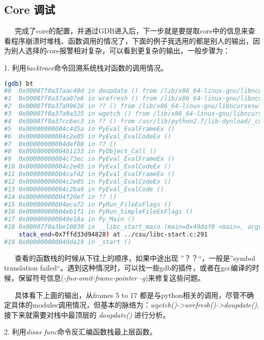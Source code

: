 \documentclass[12pt]{article}  %
\begin{document}
\subsection{Core 调试}
\ \ \ 完成了core的配置，并通过GDB进入后，下一步就是要提取core中的信息来查看程序崩溃时堆栈、函数调用的情况了，下面的例子我选用的都是别人的输出，因为别人选择的core报警相对复杂，可以看到更复杂的输出，一般步骤为：\par
1. 利用\emph{backtrace}命令回溯系统栈对函数的调用情况。\par
\begin{lstlisting}[language=sh]
(gdb) bt
#0  0x00007f0a37aac40d in doupdate () from /lib/x86_64-linux-gnu/libncursesw.so.5
#1  0x00007f0a37aa07e6 in wrefresh () from /lib/x86_64-linux-gnu/libncursesw.so.5
#2  0x00007f0a37a99616 in ?? () from /lib/x86_64-linux-gnu/libncursesw.so.5
#3  0x00007f0a37a9a325 in wgetch () from /lib/x86_64-linux-gnu/libncursesw.so.5
#4  0x00007f0a37cc6ec3 in ?? () from /usr/lib/python2.7/lib-dynload/_curses.x86_64-linux-gnu.so
#5  0x00000000004c4d5a in PyEval_EvalFrameEx ()
#6  0x00000000004c2e05 in PyEval_EvalCodeEx ()
#7  0x00000000004def08 in ?? ()
#8  0x00000000004b1153 in PyObject_Call ()
#9  0x00000000004c73ec in PyEval_EvalFrameEx ()
#10 0x00000000004c2e05 in PyEval_EvalCodeEx ()
#11 0x00000000004caf42 in PyEval_EvalFrameEx ()
#12 0x00000000004c2e05 in PyEval_EvalCodeEx ()
#13 0x00000000004c2ba9 in PyEval_EvalCode ()
#14 0x00000000004f20ef in ?? ()
#15 0x00000000004eca72 in PyRun_FileExFlags ()
#16 0x00000000004eb1f1 in PyRun_SimpleFileExFlags ()
#17 0x000000000049e18a in Py_Main ()
#18 0x00007f0a3be10830 in __libc_start_main (main=0x49daf0 <main>, argc=2, argv=0x7ffd33d94838, init=<optimized out>, fini=<optimized out>, rtld_fini=<optimized out>, 
    stack_end=0x7ffd33d94828) at ../csu/libc-start.c:291
#19 0x000000000049da19 in _start ()
\end{lstlisting}\par
\ \ \ 查看的函数栈的时候从下往上的顺序，如果中途出现 ”？？“，一般是”symbol translation failed“。遇到这种情况时，可以找一些gdb的插件，或者在gcc编译的时候，保留符号信息(\emph{-fno-omit-frame-pointer -g})来修复这些问题。\par
\ \ \ 具体看下上面的输出，从frames 5 to 17 都是与python相关的调用，尽管不确定具体的modules调用情况，但基本的脉络为：\emph{wgetch()->wrefresh()->doupdate()},接下来就需要对栈中最顶层的 \emph{doupdate()} 进行分析。\par
2. 利用\emph{disas func}命令反汇编函数栈最上层函数。\par
\end{document}
